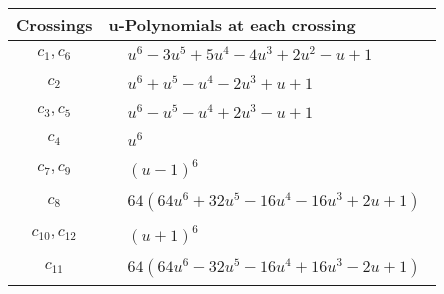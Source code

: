 \documentclass[1p]{elsarticle_modified}
\theoremstyle{definition}
\begin{document}
\begin{tabular}{m{50pt}|m{274pt}}
Crossings & \hspace{64pt}u-Polynomials at each crossing \\
\hline $$\begin{aligned}c_{1},c_{6}\end{aligned}$$&$\begin{aligned}
&u^6-3 u^5+5 u^4-4 u^3+2 u^2- u+1
\end{aligned}$\\
\hline $$\begin{aligned}c_{2}\end{aligned}$$&$\begin{aligned}
&u^6+u^5- u^4-2 u^3+u+1
\end{aligned}$\\
\hline $$\begin{aligned}c_{3},c_{5}\end{aligned}$$&$\begin{aligned}
&u^6- u^5- u^4+2 u^3- u+1
\end{aligned}$\\
\hline $$\begin{aligned}c_{4}\end{aligned}$$&$\begin{aligned}
&u^6
\end{aligned}$\\
\hline $$\begin{aligned}c_{7},c_{9}\end{aligned}$$&$\begin{aligned}
&(u-1)^6
\end{aligned}$\\
\hline $$\begin{aligned}c_{8}\end{aligned}$$&$\begin{aligned}
&64(64 u^6+32 u^5-16 u^4-16 u^3+2 u+1)
\end{aligned}$\\
\hline $$\begin{aligned}c_{10},c_{12}\end{aligned}$$&$\begin{aligned}
&(u+1)^6
\end{aligned}$\\
\hline $$\begin{aligned}c_{11}\end{aligned}$$&$\begin{aligned}
&64(64 u^6-32 u^5-16 u^4+16 u^3-2 u+1)
\end{aligned}$\\
\hline
\end{tabular}\\~\\
\end{document}
